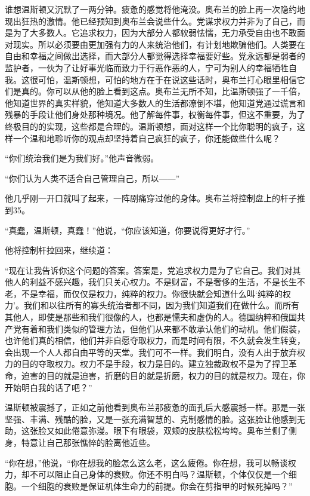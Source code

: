 谁想温斯顿又沉默了一两分钟。疲惫的感觉将他淹没。奥布兰的脸上再一次隐约地现出狂热的激情。他已经预知到奥布兰会说些什么。党谋求权力并非为了自己，而是为了大多数人。它追求权力，因为大部分人都软弱怯懦，无力承受自由也不敢面对现实。所以必须要由更加强有力的人来统治他们，有计划地欺骗他们。人类要在自由和幸福之间做出选择，而大部分人都觉得选择幸福要好些。党永远都是弱者的监护者，一伙为了让好事光临而致力于行恶作恶的人，宁可为别人的幸福牺牲自我。这很可怕，温斯顿想，可怕的地方在于在说这些话时，奥布兰打心眼里相信它们是真的。你可以从他的脸上看到这点。奥布兰无所不知，比温斯顿强了一千倍，他知道世界的真实样貌，他知道大多数人的生活都潦倒不堪，他知道党通过谎言和残暴的手段让他们身处那种境况。他了解每件事，权衡每件事，但这不重要，为了终极目的的实现，这些都是合理的。温斯顿想，面对这样一个比你聪明的疯子，这样一个温和地聆听你的观点却坚持着自己疯狂的疯子，你还能做些什么呢？

``你们统治我们是为我们好。''他声音微弱。

``你们认为人类不适合自己管理自己，所以------''

他几乎刚一开口就叫了起来，一阵剧痛穿过他的身体。奥布兰将控制盘上的杆子推到35。

``真蠢，温斯顿，真蠢！''他说，``你应该知道，你要说得更好才行。''

他将控制杆拉回来，继续道：

``现在让我告诉你这个问题的答案。答案是，党追求权力是为了它自己。我们对其他人的利益不感兴趣，我们只关心权力。不是财富，不是奢侈的生活，不是长生不老，不是幸福，而仅仅是权力，纯粹的权力。你很快就会知道什么叫`纯粹的权力'。我们和以往所有的寡头统治者都不同，因为我们知道我们在做什么。而所有其他人，即使是那些和我们很像的人，也都是懦夫和虚伪的人。德国纳粹和俄国共产党有着和我们类似的管理方法，但他们从来都不敢承认他们的动机。他们假装，也许他们真的相信，他们并非自愿夺取权力，而是时间有限，不久就会发生转变，会出现一个人人都自由平等的天堂。我们可不一样。我们明白，没有人出于放弃权力的目的夺取权力。权力不是手段，权力是目的。建立独裁政权不是为了捍卫革命，迫害的目的就是迫害，折磨的目的就是折磨，权力的目的就是权力。现在，你开始明白我的话了吧？''

温斯顿被震撼了，正如之前他看到奥布兰那疲惫的面孔后大感震撼一样。那是一张坚强、丰满、残酷的脸，又是一张充满智慧的、克制感情的脸。这张脸让他感到无助，这张脸又如此倦意弥漫。眼下有眼袋，双颊的皮肤松松垮垮。奥布兰侧了侧身，特意让自己那张憔悴的脸离他近些。

``你在想，''他说，``你在想我的脸怎么这么老，这么疲倦。你在想，我可以畅谈权力，却不可以阻止自己身体的衰败。你还不明白吗？温斯顿，个体仅仅是一个细胞。一个细胞的衰败是保证机体生命力的前提。你会在剪指甲的时候死掉吗？''

